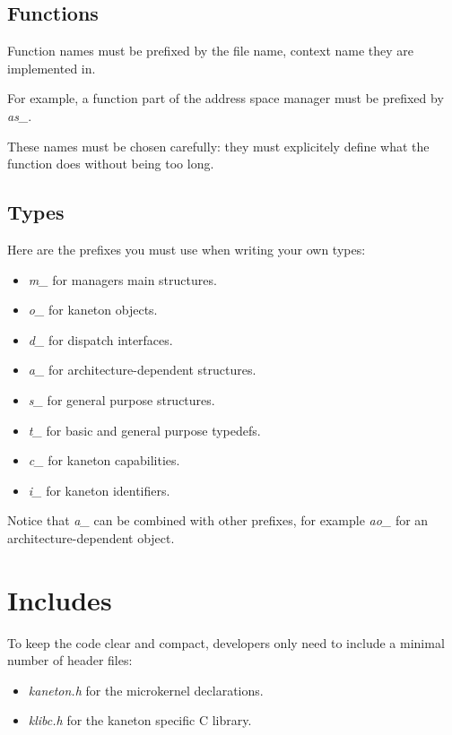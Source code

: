 %
%

\subsection{Functions}

Function names must be prefixed by the file name, context name they are
implemented in.

For example, a function part of the address space manager must be prefixed
by \textit{as\_}.

These names must be chosen carefully: they must explicitely define
what the function does without being too long.

%
%

\subsection{Types}

Here are the prefixes you must use when writing your own types:

\begin{itemize}
  \item
    \textit{m\_} for managers main structures.
  \item
    \textit{o\_} for kaneton objects.
  \item
    \textit{d\_} for dispatch interfaces.
  \item
    \textit{a\_} for architecture-dependent structures.
  \item
    \textit{s\_} for general purpose structures.
  \item
    \textit{t\_} for basic and general purpose typedefs.
  \item
    \textit{c\_} for kaneton capabilities.
  \item
    \textit{i\_} for kaneton identifiers.
\end{itemize}

Notice that \textit{a\_} can be combined with other prefixes, for
example \textit{ao\_} for an architecture-dependent object.

%
%

\section{Includes}

To keep the code clear and compact, developers only need to include a
minimal number of header files:

\begin{itemize}
  \item
    \textit{kaneton.h} for the microkernel declarations.
  \item
    \textit{klibc.h} for the kaneton specific C library.
\end{itemize}

